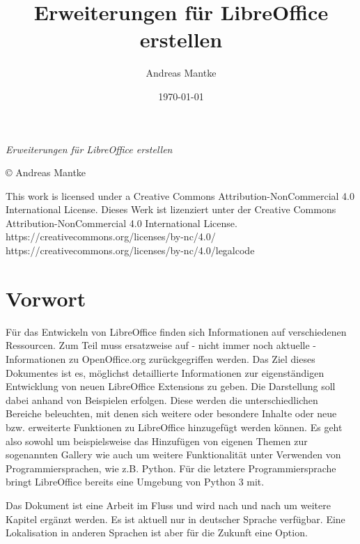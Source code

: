 \documentclass[a4paper,10pt,pagesize,titlepage]{scrbook}
\author{Andreas Mantke}
\title{Erweiterungen für LibreOffice erstellen}
\date{\today}
\begin{document}
 


\maketitle
 \setcounter{tocdepth}{10}


\begin{flushleft}
	
	\textit{Erweiterungen für LibreOffice erstellen}
	
	© Andreas Mantke 
	
	
	\noindent This work is licensed under a Creative Commons Attribution-NonCommercial 4.0 International License. Dieses Werk ist lizenziert unter der Creative Commons Attribution-NonCommercial 4.0 International License.
	https://creativecommons.org/licenses/by-nc/4.0/
	https://creativecommons.org/licenses/by-nc/4.0/legalcode
\end{flushleft}


\tableofcontents

\chapter*{Vorwort}

Für das Entwickeln von LibreOffice finden sich Informationen auf verschiedenen Ressourcen. Zum Teil muss ersatzweise auf - nicht immer noch aktuelle - Informationen zu OpenOffice.org zurückgegriffen werden. Das Ziel dieses Dokumentes ist es, möglichst detaillierte Informationen zur eigenständigen Entwicklung von neuen LibreOffice Extensions zu geben. Die Darstellung soll dabei anhand von Beispielen erfolgen. Diese werden die unterschiedlichen Bereiche beleuchten, mit denen sich weitere oder besondere Inhalte oder neue bzw. erweiterte Funktionen zu LibreOffice hinzugefügt werden können. Es geht also sowohl um beispielsweise das Hinzufügen von eigenen Themen zur sogenannten Gallery wie auch um weitere Funktionalität unter Verwenden von Programmiersprachen, wie z.B. Python. Für die letztere Programmiersprache bringt LibreOffice bereits eine Umgebung von Python 3 mit.

Das Dokument ist eine Arbeit im Fluss und wird nach und nach um weitere Kapitel ergänzt werden. Es ist aktuell nur in deutscher Sprache verfügbar. Eine Lokalisation in anderen Sprachen ist aber für die Zukunft eine Option.
\end{document}

